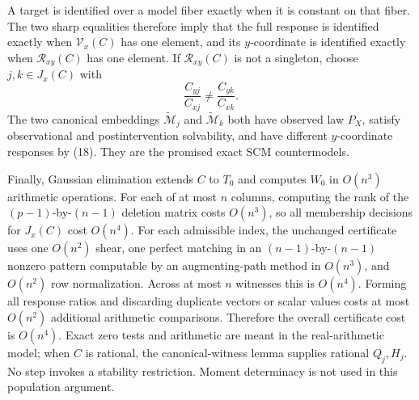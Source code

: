 A target is identified over a model fiber exactly when it is constant on that fiber. The two sharp equalities therefore imply that the full response is identified exactly when \(\mathcal V_x(C)\) has one element, and its \(y\)-coordinate is identified exactly when \(\mathcal R_{xy}(C)\) has one element. If \(\mathcal R_{xy}(C)\) is not a singleton, choose \(j,k\in J_x(C)\) with
\[
 \frac{C_{yj}}{C_{xj}}\ne\frac{C_{yk}}{C_{xk}}. \tag{18}
\]
The two canonical embeddings \(\widetilde{\mathcal M}_j\) and \(\widetilde{\mathcal M}_k\) both have observed law \(P_X\), satisfy observational and postintervention solvability, and have different \(y\)-coordinate responses by (18). They are the promised exact SCM countermodels.

Finally, Gaussian elimination extends \(C\) to \(T_0\) and computes \(W_0\) in \(O(n^3)\) arithmetic operations. For each of at most \(n\) columns, computing the rank of the \((p-1)\)-by-\((n-1)\) deletion matrix costs \(O(n^3)\), so all membership decisions for \(J_x(C)\) cost \(O(n^4)\). For each admissible index, the unchanged certificate uses one \(O(n^2)\) shear, one perfect matching in an \((n-1)\)-by-\((n-1)\) nonzero pattern computable by an augmenting-path method in \(O(n^3)\), and \(O(n^2)\) row normalization. Across at most \(n\) witnesses this is \(O(n^4)\). Forming all response ratios and discarding duplicate vectors or scalar values costs at most \(O(n^2)\) additional arithmetic comparisons. Therefore the overall certificate cost is \(O(n^4)\). Exact zero tests and arithmetic are meant in the real-arithmetic model; when \(C\) is rational, the canonical-witness lemma supplies rational \(Q_j,H_j\). No step invokes a stability restriction. Moment determinacy is not used in this population argument.